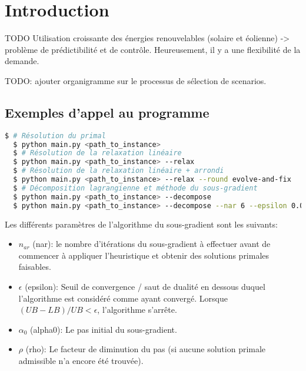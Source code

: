 \chapter{Introduction}
\vspace*{1.2cm}

TODO Utilisation croissante des énergies renouvelables (solaire et éolienne) 
-> problème de prédictibilité et de contrôle. 
Heureusement, il y a une flexibilité de la demande.

TODO: ajouter organigramme sur le processus de sélection de scenarios.

\section{Exemples d'appel au programme}

\begin{lstlisting}[language=bash]
  $ # Résolution du primal
  $ python main.py <path_to_instance>
  $ # Résolution de la relaxation linéaire
  $ python main.py <path_to_instance> --relax
  $ # Résolution de la relaxation linéaire + arrondi
  $ python main.py <path_to_instance> --relax --round evolve-and-fix
  $ # Décomposition lagrangienne et méthode du sous-gradient
  $ python main.py <path_to_instance> --decompose
  $ python main.py <path_to_instance> --decompose --nar 6 --epsilon 0.01 --alpha0 2000 --rho 0.96
\end{lstlisting}

Les différents paramètres de l'algorithme du sous-gradient sont les suivants:
\begin{itemize}
    \item $n_{ar}$ (nar): le nombre d'itérations du sous-gradient à effectuer avant de commencer à appliquer
    l'heuristique et obtenir des solutions primales faisables.
    \item $\epsilon$ (epsilon): Seuil de convergence / saut de dualité en dessous duquel l'algorithme est considéré comme
    ayant convergé. Lorsque $(UB - LB) / UB  < \epsilon$, l'algorithme s'arrête.
    \item $\alpha_0$ (alpha0): Le pas initial du sous-gradient.
    \item $\rho$ (rho): Le facteur de diminution du pas (si aucune solution primale admissible n'a encore été trouvée).
\end{itemize}